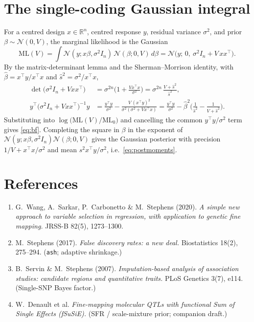\documentclass[11pt]{article}
\newcommand{\R}{\mathbb{R}}
\newcommand{\Nor}{\mathcal{N}}
\newcommand{\sigsq}{\sigma^{2}}
\newcommand{\ML}{\mathrm{ML}}
\theoremstyle{plain}
\theoremstyle{remark}
\begin{document}
\appendix
\section{The single-coding Gaussian integral}\label{app:gauss}

For a centred design $x\in\R^{n}$, centred response $y$, residual variance
$\sigsq$, and prior $\beta\sim\Nor(0,V)$, the marginal likelihood is the Gaussian
\begin{equation}
  \ML(V)=\int \Nor(y;x\beta,\sigsq I_n)\,\Nor(\beta;0,V)\,d\beta
        =\Nor\!\big(y;\,0,\ \sigsq I_n+V\,xx^{\!\top}\big).
\end{equation}
By the matrix-determinant lemma and the Sherman--Morrison identity, with
$\hat\beta=x^{\!\top}y/x^{\!\top}x$ and $\hat s^{2}=\sigsq/x^{\!\top}x$,
\begin{align}
  \det\!\big(\sigsq I_n+V xx^{\!\top}\big)
     &=\sigma^{2n}\Big(1+\frac{V x^{\!\top}x}{\sigsq}\Big)
      =\sigma^{2n}\,\frac{V+\hat s^{2}}{\hat s^{2}},\\
  y^{\!\top}\big(\sigsq I_n+Vxx^{\!\top}\big)^{-1}y
     &=\frac{y^{\!\top}y}{\sigsq}-\frac{V\,(x^{\!\top}y)^{2}}{\sigsq(\sigsq+Vx^{\!\top}x)}
      =\frac{y^{\!\top}y}{\sigsq}-\hat\beta^{2}\Big(\frac1{\hat s^{2}}-\frac1{V+\hat s^{2}}\Big).
\end{align}
Substituting into $\log\big(\ML(V)/\ML_0\big)$ and cancelling the common
$y^{\!\top}y/\sigsq$ term gives \eqref{eq:bf}. Completing the square in $\beta$ in
the exponent of $\Nor(y;x\beta,\sigsq I_n)\Nor(\beta;0,V)$ gives the Gaussian
posterior with precision $1/V+x^{\!\top}x/\sigsq$ and mean
$s^{2}x^{\!\top}y/\sigsq$, i.e.\ \eqref{eq:postmoments}.

\section*{References}
\begin{enumerate}\itemsep1pt
\item G.\ Wang, A.\ Sarkar, P.\ Carbonetto \& M.\ Stephens (2020). \textit{A simple
  new approach to variable selection in regression, with application to genetic
  fine mapping.} JRSS-B 82(5), 1273--1300.
\item M.\ Stephens (2017). \textit{False discovery rates: a new deal.}
  Biostatistics 18(2), 275--294. (\texttt{ash}; adaptive shrinkage.)
\item B.\ Servin \& M.\ Stephens (2007). \textit{Imputation-based analysis of
  association studies: candidate regions and quantitative traits.} PLoS Genetics
  3(7), e114. (Single-SNP Bayes factor.)
\item W.\ Denault et al. \textit{Fine-mapping molecular QTLs with functional
  Sum of Single Effects (fSuSiE).} (SFR / scale-mixture prior; companion draft.)
\end{enumerate}
\end{document}

